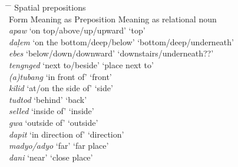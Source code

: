 \ea
\label{bkm:Ref329066261}
\begin{tabbing}
\hspace{2cm} \= \hspace{4.8cm} \= \kill
Spatial prepositions \\
Form \> Meaning as Preposition  \>  Meaning as relational noun \\
\textit{apaw} \> ‘on top/above/up/upward’ \>   ‘top’ \\
\textit{daļem} \> ‘on the bottom/deep/below’ \>   ‘bottom/deep/underneath’ \\
\textit{ebes} \> ‘below/down/downward’ \> ‘downstairs/underneath??’ \\
\textit{tengnged} \> ‘next to/beside’     \>   ‘place next to’ \\
\textit{(a)tubang} \> ‘in front of’  \>          ‘front’ \\
\textit{kilid} \>`at/on the side of'   \>     ‘side’ \\
\textit{tudtod} \> ‘behind’ \>           ‘back’ \\
\textit{selled} \> ‘inside of’  \>          ‘inside’ \\
\textit{gwa} \> ‘outside of’     \>       ‘outside’ \\
\textit{dapit} \> ‘in direction of’ \>       ‘direction’ \\
\textit{madyo/adyo} \> ‘far’ \>           ‘far place’ \\
\textit{dani} \> ‘near’      \>      ‘close place’
\end{tabbing}
\z


